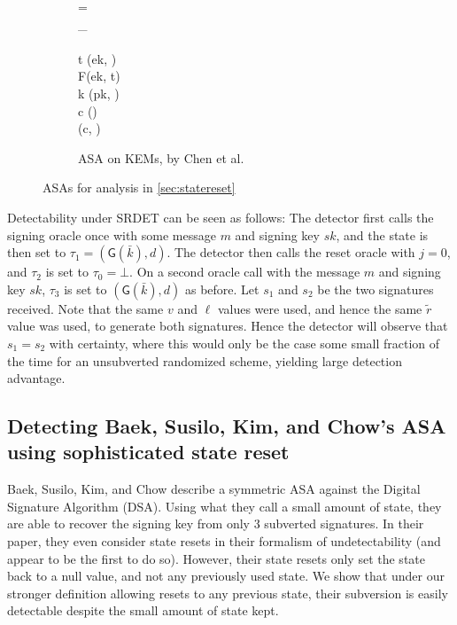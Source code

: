 \begin{figure}
\begin{subfigure}[t]{0.25\textwidth}
{	\pcif \tau = \bot \pcthen \\
	\pcind \tau \sample {}_ \\
	\pcelse \\
	\pcind t \leftarrow {}(ek, \tau) \\
	\pcind \tau \leftarrow \textsf{F}(ek, t) \\
	k \leftarrow {}(pk, \tau) \\
	c \leftarrow {}(\tau) \\
	\pcreturn (c, \tau)
}
\caption{ASA on KEMs, by Chen et al. \cite{AC:CheHuaYun20}}
\label{figure:chysubv}
\end{subfigure}
\caption{ASAs for analysis in \autoref{sec:statereset}}
\end{figure}

Detectability under SRDET can be seen as follows: The detector first calls the signing oracle once with some message $m$ and signing key $sk$, and the state is then set to $\tau_1 = (\textsf{G}(\bar{k}), d)$. The detector then calls the reset oracle with $j=0$, and $\tau_2$ is set to $\tau_0 = \bot$. On a second oracle call with the message $m$ and signing key $sk$, $\tau_3$ is set to $(\textsf{G}(\bar{k}), d)$ as before. Let $s_1$ and $s_2$ be the two signatures received. Note that the same $v$ and $\ell$ values were used, and hence the same $\tilde{r}$ value was used, to generate both signatures. Hence the detector will observe that $s_1=s_2$ with certainty, where this would only be the case some small fraction of the time for an unsubverted randomized scheme, yielding large detection advantage.

\subsection{Detecting Baek, Susilo, Kim, and Chow's ASA using sophisticated state reset} \label{sec:attackasas:bskc}

Baek, Susilo, Kim, and Chow \cite{BSKC2019} describe a symmetric ASA against the Digital Signature Algorithm (DSA). Using what they call a small amount of state, they are able to recover the signing key from only 3 subverted signatures. In their paper, they even consider state resets in their formalism of undetectability (and appear to be the first to do so). However, their state resets only set the state back to a null value, and not any previously used state. We show that under our stronger definition allowing resets to any previous state, their subversion is easily detectable despite the small amount of state kept.

